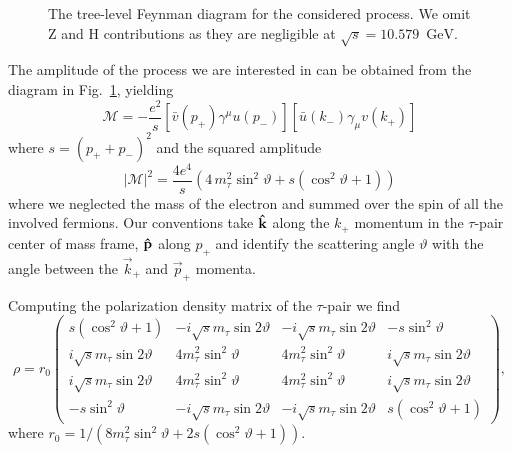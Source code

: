 \documentclass[a4paper,12pt,twocolumn]{article}
\numberwithin{equation}{section} %
\def\abs#1{\left| #1\right|}
\newcommand{\hk}{{\bf \hat{k}}}
\newcommand{\hp}{{\bf \hat{p}}}
\newcommand{\Pgt}{\ensuremath{\tau}\xspace}
\newcommand{\PH}{\ensuremath{\textrm{H}}\xspace}
\newcommand{\PZ}{\ensuremath{\textrm{Z}}\xspace}
\newcommand{\GeV}{\ensuremath{\textrm{GeV}}\xspace}
\begin{document}
\begin{figure}[h]
\centering
{}
\caption{The tree-level Feynman diagram for the considered process. We omit $\PZ$ and $\PH$ contributions as they are negligible at $\sqrt{s} = 10.579$~\GeV. }
\label{fig:diag}
\end{figure}

The amplitude of the process we are interested in can be obtained from the diagram in Fig.~\ref{fig:diag}, yielding 
\begin{equation}
\mathcal{M}=
-\frac{e^2}{s} \left[\bar{v}(p_+)\gamma^\mu u(p_-)\right]\left[ \bar u(k_-)\gamma_\mu v(k_+)\right]
\end{equation}
where $s=(p_+ + p_-)^2$ and the squared amplitude 
\begin{equation}
    \abs{\mathcal{M}}^2=\frac{4 e^4}{s}  \left(4 \, m_{\Pgt}^2\sin^2\vartheta + s\left(\cos^2\vartheta + 1\right) \right)
\end{equation}
where we neglected the mass of the electron and summed over the spin of all the involved fermions. Our conventions take $\hk$ along the $k_+$ momentum in the $\tau$-pair center of mass frame, $\hp$ along $p_+$ and identify the scattering angle $\vartheta$ with the angle between the $\vec{k}_+$ and $\vec{p}_+$ momenta. 

Computing the polarization density matrix of the $\Pgt$-pair we find 
\begin{equation}
\rho = r_0
{\begin{pmatrix}
 s \left(\cos^2 \vartheta +1\right) & -i \sqrt{s}m_{\tau } \sin 2\vartheta  & -i \sqrt{s}m_{\tau } \sin 2\vartheta  & -s \sin^2 \vartheta 
 \\
 i \sqrt{s}m_{\tau } \sin 2\vartheta  & 4 m_{\tau }^2\sin^2 \vartheta   & 4 m_{\tau }^2\sin^2 \vartheta   & i \sqrt{s}m_{\tau } \sin 2\vartheta  
 \\
 i \sqrt{s}m_{\tau } \sin 2\vartheta  & 4 m_{\tau }^2\sin^2 \vartheta  & 4 m_{\tau }^2\sin^2 \vartheta  & i \sqrt{s}m_{\tau } \sin 2\vartheta 
 \\
 -s \sin^2 \vartheta & -i \sqrt{s}m_{\tau } \sin 2\vartheta & -i \sqrt{s}m_{\tau } \sin 2\vartheta & s \left(\cos^2 \vartheta +1\right) 
\end{pmatrix}},
\end{equation}
where $r_0=1/(8  m_{\tau }^2\sin^2 \vartheta +2s (\cos^2\vartheta +1))$.
\end{document}
